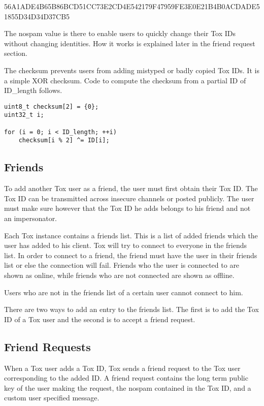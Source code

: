 \documentclass{tox}
\begin{document}
56A1ADE4B65B86BCD51CC73E2CD4E542179F47959FE3E0E21B4B0ACDADE51855D34D34D37CB5

The nospam value is there to enable users to quickly change their Tox IDs 
without changing identities. How it works is explained later in the friend 
request section.

The checksum prevents users from adding mistyped or badly copied Tox IDs. It is 
a simple XOR checksum. Code to compute the checksum from a partial ID of 
ID\_length follows.

\begin{lstlisting}
uint8_t checksum[2] = {0};
uint32_t i;

for (i = 0; i < ID_length; ++i)
    checksum[i % 2] ^= ID[i];

\end{lstlisting}

\subsection{Friends}

To add another Tox user as a friend, the user must first obtain their Tox ID. 
The Tox ID can be transmitted across insecure channels or posted publicly. The 
user must make sure however that the Tox ID he adds belongs to his friend and 
not an impersonator.

Each Tox instance contains a friends list. This is a list of added friends 
which the user has added to his client. Tox will try to connect to everyone in 
the friends list. In order to connect to a friend, the friend must have the 
user in their friends list or else the connection will fail. Friends who the 
user is connected to are shown as online, while friends who are not connected are 
shown as offline.

Users who are not in the friends list of a certain user cannot connect to him.

There are two ways to add an entry to the friends list. The first is to add the 
Tox ID of a Tox user and the second is to accept a friend request.

\subsection{Friend Requests}

When a Tox user adds a Tox ID, Tox sends a friend request to the Tox user 
corresponding to the added ID. A friend request contains the long term public 
key of the user making the request, the nospam contained in the Tox ID, and a 
custom user specified message.
\end{document}
